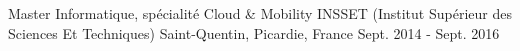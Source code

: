 

\begin{cventries}

  \cventry
    {Master Informatique, spécialité Cloud \& Mobility} %
    {INSSET (Institut Supérieur des Sciences Et Techniques)} %
    {Saint-Quentin, Picardie, France} %
    {Sept. 2014 - Sept. 2016} %
    {}
\end{cventries}
